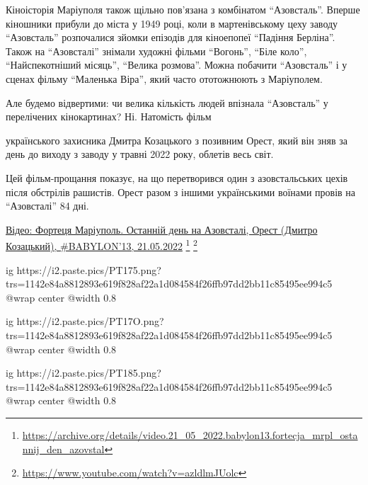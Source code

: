 

Кіноісторія Маріуполя також щільно пов’язана з комбінатом \enquote{Азовсталь}. Вперше
кіношники прибули до міста у 1949 році, коли в мартенівському цеху заводу
\enquote{Азовсталь} розпочалися зйомки епізодів для кіноепопеї \enquote{Падіння Берліна}. Також
на \enquote{Азовсталі} знімали художні фільми \enquote{Вогонь}, \enquote{Біле коло}, \enquote{Найспекотніший
місяць}, \enquote{Велика розмова}. Можна побачити \enquote{Азовсталь} і у сценах фільму
\enquote{Маленька Віра}, який часто ототожнюють з Маріуполем.

Але будемо відвертими: чи велика кількість людей впізнала \enquote{Азовсталь} у
перелічених кінокартинах? Ні. Натомість фільм\par\noindent українського захисника Дмитра
Козацького з позивним Орест, який він зняв за день до виходу з заводу у травні
2022 року, облетів весь світ.

Цей фільм-прощання показує, на що перетворився один з азовстальських цехів
після обстрілів рашистів. Орест разом з іншими українськими воїнами провів на
\enquote{Азовсталі} 84 дні.

\href{https://archive.org/details/video.21_05_2022.babylon13.fortecja_mrpl_ostannij_den_azovstal}{%
Відео: Фортеця Маріуполь. Останній день на Азовсталі, Орест (Дмитро Козацький), \#BABYLON'13, 21.05.2022}%
\footnote{\url{https://archive.org/details/video.21_05_2022.babylon13.fortecja_mrpl_ostannij_den_azovstal}} %
\footnote{\url{https://www.youtube.com/watch?v=azldlmJUolc}}

\ifcmt
  ig https://i2.paste.pics/PT175.png?trs=1142e84a8812893e619f828af22a1d084584f26ffb97dd2bb11c85495ee994c5
  @wrap center
  @width 0.8
\fi

\ifcmt
  ig https://i2.paste.pics/PT17O.png?trs=1142e84a8812893e619f828af22a1d084584f26ffb97dd2bb11c85495ee994c5
  @wrap center
  @width 0.8
\fi

\ifcmt
  ig https://i2.paste.pics/PT185.png?trs=1142e84a8812893e619f828af22a1d084584f26ffb97dd2bb11c85495ee994c5
  @wrap center
  @width 0.8
\fi

